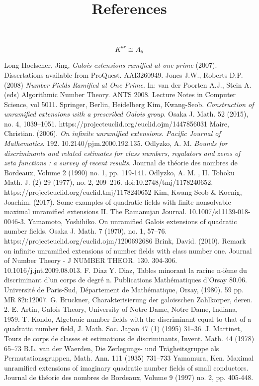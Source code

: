 \documentclass[preprint,12pt,reqno]{elsarticle}
\begin{document}
\begin{equation}
    K^{ur}\cong A_{5}
\end{equation}
\begin{thebibliography}{9}
\title{References}
Long Hoelscher, Jing, \textit{Galois extensions ramified at one prime} (2007). Dissertations available from ProQuest. AAI3260949. 
Jones J.W., Roberts D.P. (2008) \textit{Number Fields Ramified at One Prime}. In: van der Poorten A.J., Stein A. (eds) Algorithmic Number Theory. ANTS 2008. Lecture Notes in Computer Science, vol 5011. Springer, Berlin, Heidelberg
Kim, Kwang-Seob. \textit{Construction of unramified extensions with a prescribed Galois group}. Osaka J. Math. 52 (2015), no. 4, 1039--1051. https://projecteuclid.org/euclid.ojm/1447856031
Maire, Christian. (2006). \textit{On infinite unramified extensions. Pacific Journal of Mathematics}. 192. 10.2140/pjm.2000.192.135. 
Odlyzko, A. M. \textit{Bounds for discriminants and related estimates for class numbers, regulators and zeros of zeta functions : a survey of recent results}. Journal de théorie des nombres de Bordeaux, Volume 2 (1990) no. 1, pp. 119-141. 
Odlyzko, A. M. , II. Tohoku Math. J. (2) 29 (1977), no. 2, 209--216. doi:10.2748/tmj/1178240652. https://projecteuclid.org/euclid.tmj/1178240652
Kim, Kwang-Seob & Koenig, Joachim. (2017). Some examples of quadratic fields with finite nonsolvable maximal unramified extensions II. The Ramanujan Journal. 10.1007/s11139-018-0046-3. 
Yamamoto, Yoshihiko. On unramified Galois extensions of quadratic number fields. Osaka J. Math. 7 (1970), no. 1, 57--76. https://projecteuclid.org/euclid.ojm/1200692686
Brink, David. (2010). Remark on infinite unramified extensions of number fields with class number one. Journal of Number Theory - J NUMBER THEOR. 130. 304-306. 10.1016/j.jnt.2009.08.013. 
 F. Diaz Y. Diaz, Tables minorant la racine n-ième du discriminant d'un corps de degré n. Publications Mathématiques d'Orsay 80.06. Université de Paris-Sud, Département de Mathématique, Orsay, (1980). 59 pp. MR 82i:12007.
 G. Bruckner, Charakterisierung der galoisschen Zahlkorper, deren. 2. E. Artin, Galois Theory, University of Notre Dame, Notre Dame, Indiana, 1959.
 T. Kondo, Algebraic number fields with the discriminant equal to that of a quadratic number field, J. Math. Soc. Japan 47 (1)
(1995) 31–36.
 J. Martinet, Tours de corps de classes et estimations de discriminants, Invent. Math. 44 (1978) 65–73
 B.L. van der Waerden, Die Zerlegungs- und Trägheitsgruppe als Permutationsgruppen, Math. Ann. 111 (1935) 731–733
 Yamamura, Ken. Maximal unramified extensions of imaginary quadratic number fields of small conductors. Journal de théorie des nombres de Bordeaux, Volume 9 (1997) no. 2, pp. 405-448.
\end{thebibliography}
\end{document}
